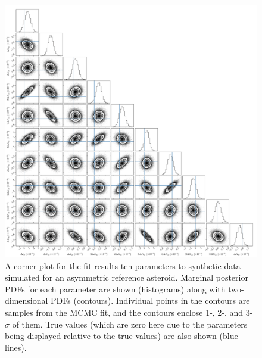 \documentclass[fleqn,usenatbib]{mnras}
\begin{document}
\begin{figure}
  \centering
  \includegraphics[width=\textwidth]{figs/example-corner.pdf}
  \caption{A corner plot for the fit results ten parameters to synthetic data simulated for an asymmetric reference asteroid. Marginal posterior PDFs for each parameter are shown (histograms) along with two-dimensional PDFs (contours). Individual points in the contours are samples from the MCMC fit, and the contours enclose 1-, 2-, and 3-$\sigma$ of them. True values (which are zero here due to the parameters being displayed relative to the true values) are also shown (blue lines).}
  \label{fig:example-corner}
\end{figure}






\bsp	%
\label{lastpage}
\end{document}
